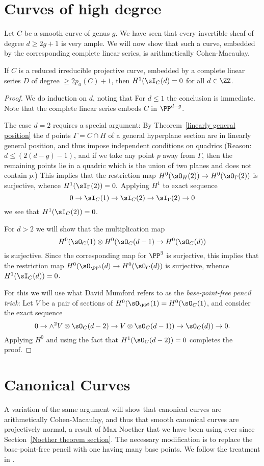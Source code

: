 \section{Curves of high degree}
Let $C$ be a smooth curve of  genus $g$. We have seen that every invertible sheaf of degree $d \geq 2g+1$ is very ample. We will now show that
such a curve,  embedded by the corresponding complete linear series, is arithmetically Cohen-Macaulay.
\begin{theorem}\label{high degree ACM}
If $C$ is a reduced irreducible projective curve, embedded by a complete linear series $D$ of degree $\geq 2p_a(C)+1$, then
$H^1(\sI_C(d) = 0$ for all $d\in \ZZ$.
\end{theorem}

\begin{proof} We do induction on $d$, noting that
For $d\leq 1$ the conclusion is immediate. Note that the complete linear series
embeds $C$ in $\PP^{d-g}$. 

The case $d=2$ requires a special argument: By Theorem~\ref{linearly general position} the $d$ points $\Gamma = C\cap H$ of a
general hyperplane section are in linearly general position, and thus impose independent conditions on quadrics
(Reason: $d\leq (2(d-g)-1)$, and if we take any point $p$ away from $\Gamma$, then the remaining points lie in a
quadric which is the union of two planes and does not contain $p$.) This implies that
the restriction map $H^0(\sO_H(2)) \to H^0(\sO_\Gamma(2))$ is surjective, whence $H^1(\sI_\Gamma(2)) = 0.$
Applying $H^1$ to exact sequence 
$$
0\to \sI_C(1) \to \sI_C(2) \to \sI_\Gamma(2) \to 0
$$
we see that $H^1(\sI_C(2))=0$.

For $d>2$ we will show that the multiplication map
$$
H^0(\sO_C(1) \otimes H^0(\sO_C(d-1)\to H^0(\sO_{C}(d))
$$
is surjective. Since the corresponding map for $\PP^3$ is surjective, this implies that
the restriction map
$H^0(\sO_{\PP^3}(d)\to H^0(\sO_{C}(d))$
is surjective, whence $H^1(\sI_{C}(d)) = 0$.

For this we will use what David Mumford refers to as the \emph{base-point-free pencil trick}:
Let $V$ be a pair of sections of $H^0(\sO_{\PP^3}(1) = H^0(\sO_C(1)$, and consider the exact sequence
$$
0\to \wedge^2V \otimes \sO_C(d-2) \to V\otimes \sO_{C}(d-1))\to \sO_{C}(d))\to 0.
$$
Applying $H^0$ and using the fact that $H^1(\sO_C(d-2)) = 0$ completes the proof.
\end{proof}



\section{Canonical Curves}
A variation of the same argument will show that
canonical curves are arithmetically Cohen-Macaulay, and thus that smooth canonical curves are projectively normal,
a result of Max Noether that we have been using ever since Section~\ref{Noether theorem section}.
The necessary modification is to replace the base-point-free pencil with one having many base points.
We follow the treatment in \cite{Schreyer}.
 
